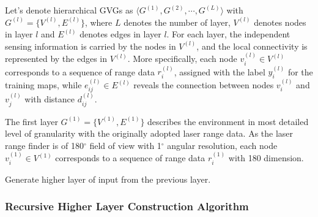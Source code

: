 \documentclass[letterpaper, 10 pt, conference]{ieeeconf}  %
\begin{document}
Let's denote hierarchical GVGs as $\langle G^{(1)},G^{(2)},\cdots,G^{(L)} \rangle$ with $G^{(l)}=\{V^{(l)},E^{(l)}\}$, where $L$ denotes the number of layer, $V^{(l)}$ denotes nodes in layer $l$ and $E^{(l)}$ denotes edges in layer $l$. For each layer, the independent sensing information is carried by the nodes in $V^{(l)}$, and the local connectivity is represented by the edges in $V^{(l)}$. More specifically, each node $v_{i}^{(l)}\in V^{(l)}$ corresponds to a sequence of range data $r_i^{(l)}$, assigned with the label $y_i^{(l)}$ for the training maps, while $e_{ij}^{(l)}\in E^{(l)}$ reveals the connection between nodes $v_i^{(l)}$ and $v_j^{(l)}$ with distance $d_{ij}^{(l)}$.


The first layer $G^{(1)}=\{V^{(1)},E^{(1)}\}$ describes the environment in most detailed level of granularity with the originally adopted laser range data. As the laser range finder is of 180$^\circ$ field of view with 1$^\circ$ angular resolution, each node $v_{i}^{(1)}\in V^{(1)}$ corresponds to a sequence of range data $r_i^{(1)}$ with 180 dimension.

\begin{algorithm}[tpb]\label{algorithm}
\caption{Generate higher layer of input from the previous layer.}

\SetAlgoNoLine\LinesNumbered {}
\BlankLine
{}
\end{algorithm}

\subsubsection{Recursive Higher Layer Construction Algorithm}
\end{document}
